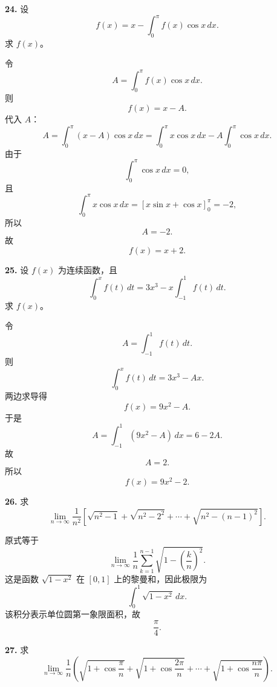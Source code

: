 \begin{problemblock}
\textbf{24.} 设
\[
f(x)=x-\int_0^\pi f(x)\cos x\,dx.
\]
求 \(f(x)\)。
\end{problemblock}

\begin{solutionblock}
令
\[
A=\int_0^\pi f(x)\cos x\,dx.
\]
则
\[
f(x)=x-A.
\]
代入 \(A\)：
\[
A=\int_0^\pi (x-A)\cos x\,dx
=\int_0^\pi x\cos x\,dx-A\int_0^\pi\cos x\,dx.
\]
由于
\[
\int_0^\pi\cos x\,dx=0,
\]
且
\[
\int_0^\pi x\cos x\,dx
=\left[x\sin x+\cos x\right]_0^\pi=-2,
\]
所以
\[
A=-2.
\]
故
\[
\boxed{f(x)=x+2}.
\]
\end{solutionblock}

\begin{problemblock}
\textbf{25.} 设 \(f(x)\) 为连续函数，且
\[
\int_0^x f(t)\,dt=3x^3-x\int_{-1}^{1}f(t)\,dt.
\]
求 \(f(x)\)。
\end{problemblock}

\begin{solutionblock}
令
\[
A=\int_{-1}^{1}f(t)\,dt.
\]
则
\[
\int_0^x f(t)\,dt=3x^3-Ax.
\]
两边求导得
\[
f(x)=9x^2-A.
\]
于是
\[
A=\int_{-1}^{1}(9x^2-A)\,dx=6-2A.
\]
故
\[
A=2.
\]
所以
\[
\boxed{f(x)=9x^2-2}.
\]
\end{solutionblock}

\begin{problemblock}
\textbf{26.} 求
\[
\lim_{n\to\infty}\frac1{n^2}\left[
\sqrt{n^2-1}+\sqrt{n^2-2^2}+\cdots+\sqrt{n^2-(n-1)^2}
\right].
\]
\end{problemblock}

\begin{solutionblock}
原式等于
\[
\lim_{n\to\infty}\frac1n\sum_{k=1}^{n-1}
\sqrt{1-\left(\frac{k}{n}\right)^2}.
\]
这是函数 \(\sqrt{1-x^2}\) 在 \([0,1]\) 上的黎曼和，因此极限为
\[
\int_0^1\sqrt{1-x^2}\,dx.
\]
该积分表示单位圆第一象限面积，故
\[
\boxed{\frac{\pi}{4}}.
\]
\end{solutionblock}

\begin{problemblock}
\textbf{27.} 求
\[
\lim_{n\to\infty}\frac1n\left(
\sqrt{1+\cos\frac{\pi}{n}}
+\sqrt{1+\cos\frac{2\pi}{n}}
+\cdots
+\sqrt{1+\cos\frac{n\pi}{n}}
\right).
\]
\end{problemblock}


